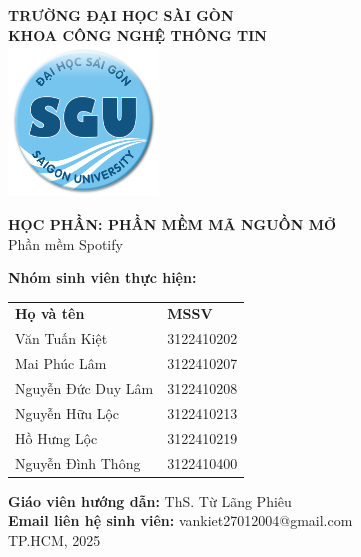 \begin{titlepage}
    \centering
    
    {\LARGE \textbf{TRƯỜNG ĐẠI HỌC SÀI GÒN}} \\[0.2cm]
    {\Large \textbf{KHOA CÔNG NGHỆ THÔNG TIN}} \\[0.5cm]
    
    \vspace{0.5cm} 
    \includegraphics[width=4cm]{imgs/logo.png} %
    
    \vspace{0.5cm} %
    
    {\huge \textbf{HỌC PHẦN: PHẦN MỀM MÃ NGUỒN MỞ}} \\[0.5cm]
    {\Large Phần mềm Spotify} \\[0.5cm]

    \vspace{0.5cm} %
    
    \textbf{Nhóm sinh viên thực hiện:} \\[0.5cm]
    
    \begin{tabular}{l l}  %
        \textbf{Họ và tên} & \textbf{MSSV} \\[0.5cm]
        
        Văn Tuấn Kiệt & 3122410202 \\[0.2cm]
        Mai Phúc Lâm & 3122410207 \\[0.2cm]
        Nguyễn Đức Duy Lâm & 3122410208 \\[0.2cm]
        Nguyễn Hữu Lộc & 3122410213 \\[0.2cm]
        Hồ Hưng Lộc & 3122410219 \\[0.2cm]
        Nguyễn Đình Thông & 3122410400 \\[0.2cm]
    \end{tabular}

    \vspace{0.5cm}

    \textbf{Giáo viên hướng dẫn:} ThS. Từ Lãng Phiêu \\[0.5cm]

    \textbf{Email liên hệ sinh viên:} vankiet27012004@gmail.com \\[0.5cm]
    
    \vfill
    {\Large TP.HCM, 2025}
\end{titlepage}
